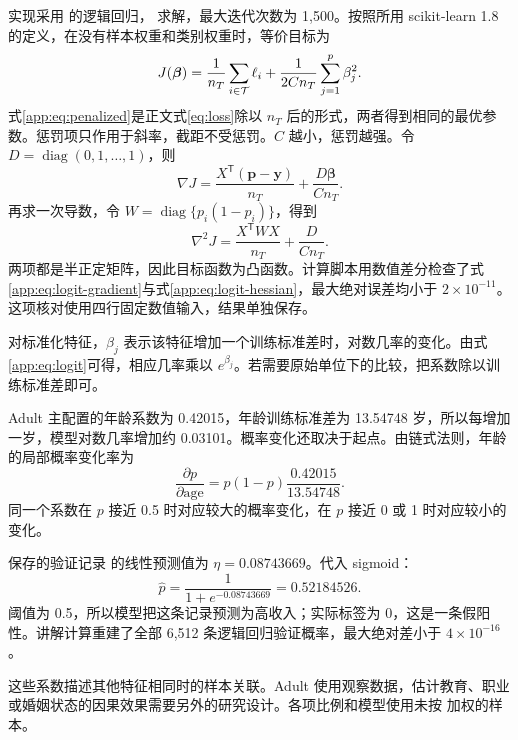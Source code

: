 实现采用  的逻辑回归， 求解，最大迭代次数为 1,500。按照所用 scikit-learn 1.8 的定义，在没有样本权重和类别权重时，等价目标为\citep{sklearn}
\begin{equation}\label{app:eq:penalized}
J(\boldsymbol\beta)=\frac1{n_T}\sum_{i\in\mathcal{T}}\ell_i
+\frac{1}{2Cn_T}\sum_{j=1}^{p}\beta_j^2.
\end{equation}
式\eqref{app:eq:penalized}是正文式\eqref{eq:loss}除以 $n_T$ 后的形式，两者得到相同的最优参数。惩罚项只作用于斜率，截距不受惩罚。$C$ 越小，惩罚越强。令 $D=\operatorname{diag}(0,1,\ldots,1)$，则
\begin{equation}\label{app:eq:logit-gradient}
\nabla J=\frac{X^{\mathsf T}(\mathbf p-\mathbf y)}{n_T}
+\frac{D\boldsymbol\beta}{Cn_T}.
\end{equation}
再求一次导数，令 $W=\operatorname{diag}\{p_i(1-p_i)\}$，得到
\begin{equation}\label{app:eq:logit-hessian}
\nabla^2J=\frac{X^{\mathsf T}WX}{n_T}+\frac{D}{Cn_T}.
\end{equation}
两项都是半正定矩阵，因此目标函数为凸函数。计算脚本用数值差分检查了式\eqref{app:eq:logit-gradient}与式\eqref{app:eq:logit-hessian}，最大绝对误差均小于 $2\times10^{-11}$。这项核对使用四行固定数值输入，结果单独保存。

对标准化特征，$\beta_j$ 表示该特征增加一个训练标准差时，对数几率的变化。由式\eqref{app:eq:logit}可得，相应几率乘以 $e^{\beta_j}$。若需要原始单位下的比较，把系数除以训练标准差即可。

Adult 主配置的年龄系数为 0.42015，年龄训练标准差为 13.54748 岁，所以每增加一岁，模型对数几率增加约 0.03101。概率变化还取决于起点。由链式法则，年龄的局部概率变化率为
\begin{equation}
\frac{\partial p}{\partial\mathrm{age}}
=p(1-p)\frac{0.42015}{13.54748}.
\end{equation}
同一个系数在 $p$ 接近 0.5 时对应较大的概率变化，在 $p$ 接近 0 或 1 时对应较小的变化。

保存的验证记录  的线性预测值为 $\eta=0.08743669$。代入 sigmoid：
\[
\hat p=\frac1{1+e^{-0.08743669}}=0.52184526.
\]
阈值为 0.5，所以模型把这条记录预测为高收入；实际标签为 0，这是一条假阳性。讲解计算重建了全部 6,512 条逻辑回归验证概率，最大绝对差小于 $4\times10^{-16}$。

这些系数描述其他特征相同时的样本关联。Adult 使用观察数据，估计教育、职业或婚姻状态的因果效果需要另外的研究设计。各项比例和模型使用未按  加权的样本。


